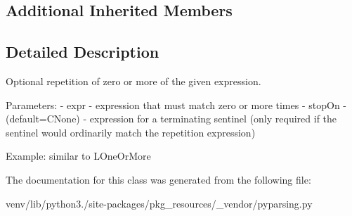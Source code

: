 \subsection*{Additional Inherited Members}


\subsection{Detailed Description}
\begin{DoxyVerb}Optional repetition of zero or more of the given expression.

Parameters:
 - expr - expression that must match zero or more times
 - stopOn - (default=C{None}) - expression for a terminating sentinel
      (only required if the sentinel would ordinarily match the repetition 
      expression)          

Example: similar to L{OneOrMore}
\end{DoxyVerb}
 

The documentation for this class was generated from the following file\+:\begin{DoxyCompactItemize}
\item 
venv/lib/python3./site-\/packages/pkg\+\_\+resources/\+\_\+vendor/pyparsing.\+py\end{DoxyCompactItemize}
